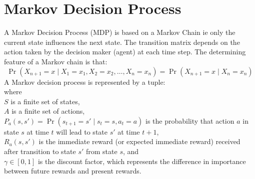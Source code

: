 \documentclass[hidelinks,BTech]{iitmdiss}
\begin{document}
\section {Markov Decision Process}
A Markov Decision Process (MDP) is based on a Markov Chain ie only the current state influences the next state. The transition matrix depends on the action taken by the decision maker (agent) at each time step. The determining feature of a Markov chain is that:
\begin{equation}
\Pr(X_{n+1}=x\mid X_1=x_1, X_2=x_2, \ldots, X_n=x_n) = \Pr(X_{n+1}=x\mid X_n=x_n)
\end{equation}
A Markov decision process is represented by a tuple:
\begin{equation}
[S, A, P_a(s,s'), R_a(s,s'), \gamma]
\end{equation}
where\\
$S$ is a finite set of states,\\
$A$ is a finite set of actions,\\
$P_a(s,s') = \Pr(s_{t+1}=s' \mid s_t=s, a_t=a)$ is the probability that action $a$ in state $s$ at time $t$ will lead to state $s'$ at time $t+1$,\\
$R_a(s,s')$ is the immediate reward (or expected immediate reward) received after transition to state $s'$ from state $s$, and\\
$\gamma \in [0,1]$ is the discount factor, which represents the difference in importance between future rewards and present rewards.

%
%
\end{document}
